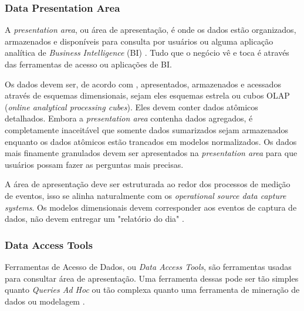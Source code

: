 \subsubsection{Data Presentation Area}
A \textit{presentation area}, ou área de apresentação, é onde os dados estão organizados, armazenados e disponíveis para consulta por usuários ou alguma aplicação analítica de \textit{Business Intelligence} (BI) \citep{kimball2013}. Tudo que o negócio vê e toca é através das ferramentas de acesso ou aplicações de BI.

Os dados devem ser, de acordo com , apresentados, armazenados e acessados através de esquemas dimensionais, sejam eles esquemas estrela ou cubos OLAP (\textit{online analytical processing cubes}). Eles devem conter dados atômicos detalhados. Embora a \textit{presentation area} contenha dados agregados, é completamente inaceitável que somente dados sumarizados sejam armazenados enquanto os dados atômicos estão trancados em modelos normalizados. Os dados mais finamente granulados devem ser apresentados na \textit{presentation area} para que usuários possam fazer as perguntas mais precisas.

A área de apresentação deve ser estruturada ao redor dos processos de medição de eventos, isso se alinha naturalmente com os \textit{operational source data capture systems}. Os modelos dimensionais devem corresponder aos eventos de captura de dados, não devem entregar um "relatório do dia" \citep{jmj}. 

\subsubsection{Data Access Tools} Ferramentas de Acesso de Dados, ou \textit{Data Access Tools}, são ferramentas usadas para consultar área de apresentação. Uma ferramenta dessas pode ser tão simples quanto \textit{Queries Ad Hoc} ou tão complexa quanto uma ferramenta de mineração de dados ou modelagem \citep{kimball2013}. 

